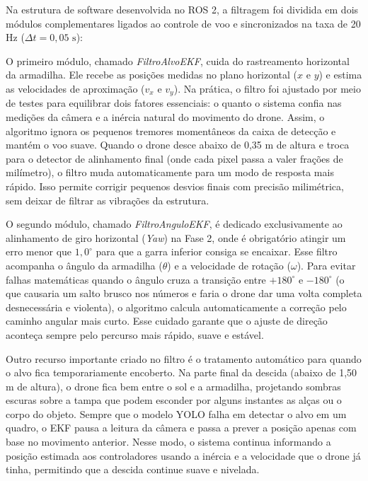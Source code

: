 Na estrutura de software desenvolvida no ROS 2, a filtragem foi dividida em dois módulos complementares ligados ao controle de voo e sincronizados na taxa de 20 Hz ($\Delta t = 0{,}05\text{ s}$):

O primeiro módulo, chamado \textit{FiltroAlvoEKF}, cuida do rastreamento horizontal da armadilha. Ele recebe as posições medidas no plano horizontal ($x$ e $y$) e estima as velocidades de aproximação ($v_x$ e $v_y$). Na prática, o filtro foi ajustado por meio de testes para equilibrar dois fatores essenciais: o quanto o sistema confia nas medições da câmera e a inércia natural do movimento do drone. Assim, o algoritmo ignora os pequenos tremores momentâneos da caixa de detecção e mantém o voo suave. Quando o drone desce abaixo de 0,35 m de altura e troca para o detector de alinhamento final (onde cada pixel passa a valer frações de milímetro), o filtro muda automaticamente para um modo de resposta mais rápido. Isso permite corrigir pequenos desvios finais com precisão milimétrica, sem deixar de filtrar as vibrações da estrutura.

O segundo módulo, chamado \textit{FiltroAnguloEKF}, é dedicado exclusivamente ao alinhamento de giro horizontal (\textit{Yaw}) na Fase 2, onde é obrigatório atingir um erro menor que $1{,}0^\circ$ para que a garra inferior consiga se encaixar. Esse filtro acompanha o ângulo da armadilha ($\theta$) e a velocidade de rotação ($\omega$). Para evitar falhas matemáticas quando o ângulo cruza a transição entre $+180^\circ$ e $-180^\circ$ (o que causaria um salto brusco nos números e faria o drone dar uma volta completa desnecessária e violenta), o algoritmo calcula automaticamente a correção pelo caminho angular mais curto. Esse cuidado garante que o ajuste de direção aconteça sempre pelo percurso mais rápido, suave e estável.

Outro recurso importante criado no filtro é o tratamento automático para quando o alvo fica temporariamente encoberto. Na parte final da descida (abaixo de 1,50 m de altura), o drone fica bem entre o sol e a armadilha, projetando sombras escuras sobre a tampa que podem esconder por alguns instantes as alças ou o corpo do objeto. Sempre que o modelo YOLO falha em detectar o alvo em um quadro, o EKF pausa a leitura da câmera e passa a prever a posição apenas com base no movimento anterior. Nesse modo, o sistema continua informando a posição estimada aos controladores usando a inércia e a velocidade que o drone já tinha, permitindo que a descida continue suave e nivelada.

